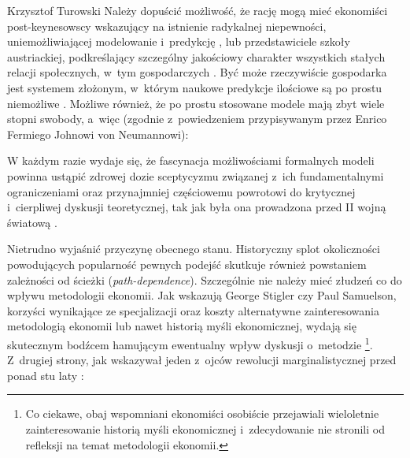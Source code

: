 \begin{artplenv}{Krzysztof Turowski}
Należy dopuścić możliwość, że rację mogą mieć ekonomiści post-keynesowscy wskazujący na istnienie radykalnej
niepewności, uniemożliwiającej modelowanie i~predykcję
\parencite{davidson_keynes_2009},
lub przedstawiciele
szkoły austriackiej, podkreślający szczególny jakościowy charakter wszystkich stałych relacji społecznych, w~tym
gospodarczych
\parencite{mises_ludzkie_2007}.
Być może rzeczywiście gospodarka jest systemem złożonym, w~którym
naukowe predykcje ilościowe są po prostu niemożliwe
\parencite{hayek_theory_1964}.
Możliwe również, że po
prostu stosowane modele mają zbyt wiele stopni swobody, a~więc (zgodnie z~powiedzeniem przypisywanym przez Enrico
Fermiego Johnowi von Neumannowi):


W każdym razie wydaje się, że fascynacja możliwościami formalnych modeli powinna ustąpić zdrowej dozie sceptycyzmu
związanej z~ich fundamentalnymi ograniczeniami oraz przynajmniej częściowemu powrotowi do krytycznej i~cierpliwej
dyskusji teoretycznej, tak jak była ona prowadzona przed II wojną światową
\parencite{blaug_formalist_2003_tur}.

Nietrudno wyjaśnić przyczynę obecnego stanu. Historyczny splot okoliczności powodujących popularność pewnych podejść
skutkuje również powstaniem zależności od ścieżki (\textit{path-dependence}). Szczególnie nie należy mieć złudzeń co do
wpływu metodologii ekonomii. Jak wskazują George Stigler czy Paul Samuelson, korzyści wynikające ze specjalizacji oraz
koszty alternatywne zainteresowania metodologią ekonomii lub nawet historią myśli ekonomicznej, wydają się skutecznym
bodźcem hamującym ewentualny wpływ dyskusji o~metodzie
\parencite{samuelson_out_1987,stigler_does_1969}\footnote{Co ciekawe, obaj wspomniani ekonomiści osobiście przejawiali wieloletnie zainteresowanie historią myśli
ekonomicznej i~zdecydowanie nie stronili od refleksji na temat metodologii ekonomii.}. Z~drugiej strony, jak wskazywał
jeden z~ojców rewolucji marginalistycznej przed ponad stu laty
\parencite{menger_investigations_1996}:


\end{artplenv}
